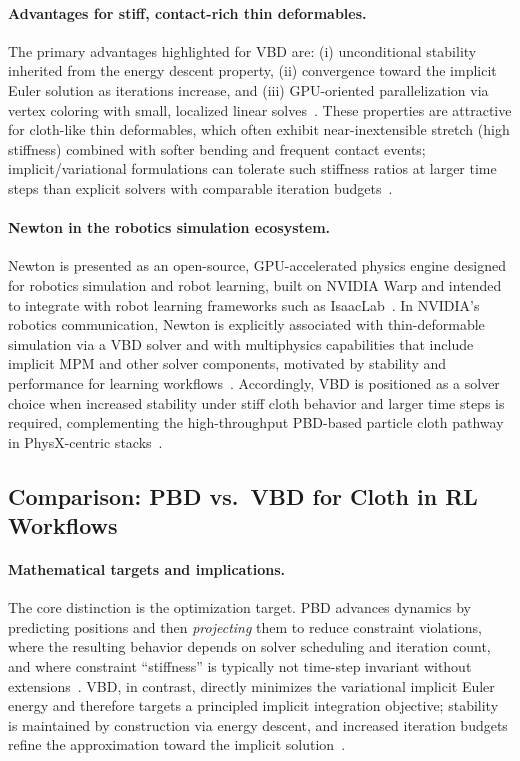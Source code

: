 \paragraph{Advantages for stiff, contact-rich thin deformables.}
The primary advantages highlighted for \ac{VBD} are: (i) unconditional stability inherited
from the energy descent property, (ii) convergence toward the implicit Euler solution as
iterations increase, and (iii) \ac{GPU}-oriented parallelization via vertex coloring with small,
localized linear solves~\cite{Chen2024VBD}.
These properties are attractive for cloth-like thin deformables, which often exhibit
near-inextensible stretch (high stiffness) combined with softer bending and frequent
contact events; implicit/variational formulations can tolerate such stiffness ratios at larger
time steps than explicit solvers with comparable iteration budgets~\cite{Chen2024VBD}.

\paragraph{Newton in the robotics simulation ecosystem.}
Newton is presented as an open-source, \ac{GPU}-accelerated physics engine designed for
robotics simulation and robot learning, built on NVIDIA Warp and intended to integrate with
robot learning frameworks such as IsaacLab~\cite{newton_physics_doc,nvidia_newton_announcement_2025}.
In NVIDIA's robotics communication, Newton is explicitly associated with thin-deformable
simulation via a \ac{VBD} solver and with multiphysics capabilities that include implicit
\ac{MPM} and other solver components, motivated by stability and performance for learning
workflows~\cite{nvidia_isaaclab_newton_blog_2025,nvidia_newton_announcement_2025}.
Accordingly, \ac{VBD} is positioned as a solver choice when increased stability under stiff
cloth behavior and larger time steps is required, complementing the high-throughput
\ac{PBD}-based particle cloth pathway in PhysX-centric stacks~\cite{nvidia_isaaclab_newton_blog_2025,Chen2024VBD}.

\subsection{Comparison: \acs{PBD} vs.\ \acs{VBD} for Cloth in \ac{RL} Workflows}

\paragraph{Mathematical targets and implications.}
The core distinction is the optimization target.
\ac{PBD} advances dynamics by predicting positions and then \emph{projecting} them to reduce
constraint violations, where the resulting behavior depends on solver scheduling and
iteration count, and where constraint ``stiffness'' is typically not time-step invariant without
extensions~\cite{muller2007pbd,macklin2016xpbd}.
\ac{VBD}, in contrast, directly minimizes the variational implicit Euler energy and therefore
targets a principled implicit integration objective; stability is maintained by construction via
energy descent, and increased iteration budgets refine the approximation toward the implicit
solution~\cite{Chen2024VBD}.

